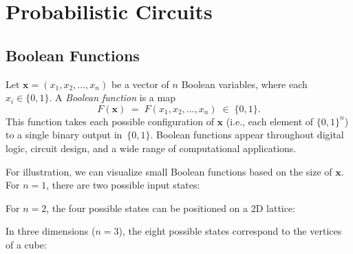 \chapter{Probabilistic Circuits}
\label{chap:boolean_prob_circuits}

\section{Boolean Functions}
\label{sec:boolean_functions}

Let \(\mathbf{x} = (x_1, x_2, \dots, x_n)\) be a vector of \(n\) Boolean variables, where each \(x_i \in \{0,1\}\). A \emph{Boolean function} is a map
\begin{equation}
\label{eq:boolean_function}
F(\mathbf{x}) \;=\; F(x_1, x_2, \dots, x_n) \;\in\; \{0,1\}.
\end{equation}
This function takes each possible configuration of \(\mathbf{x}\) (i.e., each element of \(\{0,1\}^n\)) to a single binary output in~\(\{0,1\}\). Boolean functions appear throughout digital logic, circuit design, and a wide range of computational applications.

For illustration, we can visualize small Boolean functions based on the size of \(\mathbf{x}\). For \(n=1\), there are two possible input states:

\begin{center}
\end{center}

For \(n=2\), the four possible states can be positioned on a 2D lattice:

\begin{center}
\end{center}

In three dimensions (\(n=3\)), the eight possible states correspond to the vertices of a cube:

